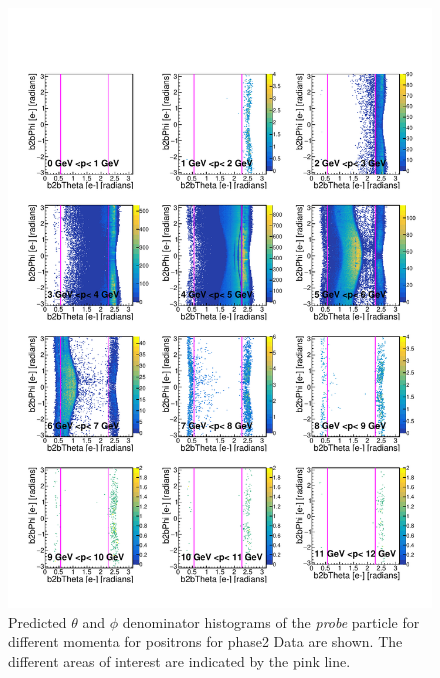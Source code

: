 \documentclass[a4paper,11pt,twosided,final,german,openbib,pdftex,listof=totoc,bibliography=totoc]{scrbook}
\begin{document}
\begin{appendix}
\begin{figure}[h!]
	\includegraphics[width=\textwidth]{Plots/master/RTPMepE_Data.pdf}
	\caption[Enumerator $\theta$-$\phi$ Positron Momentum Phase2 Data]{Predicted $\theta$ and $\phi$ denominator histograms of the \textit{probe} particle for different momenta for positrons for phase2 Data are shown. The different areas of interest are indicated by the pink line.}
	\label{plt:RTPMepE_Data}
\end{figure}






\end{appendix}
\end{document}
